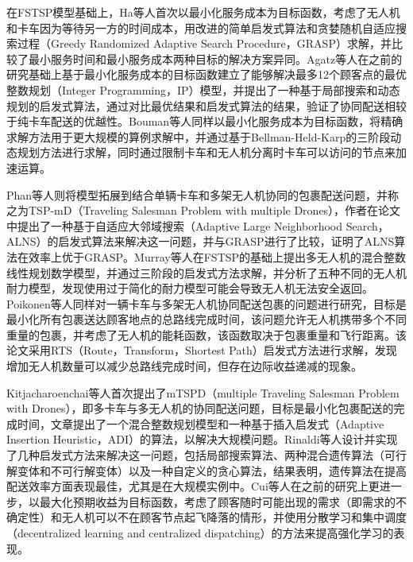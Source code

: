 \documentclass[fontset=none]{ctexart}
\begin{document}
在FSTSP模型基础上，Ha等人首次以最小化服务成本为目标函数\cite{haMincostTravelingSalesman2018}，考虑了无人机和卡车因为等待另一方的时间成本，用改进的简单启发式算法和贪婪随机自适应搜索过程（Greedy Randomized Adaptive Search Procedure，GRASP）求解，并比较了最小服务时间和最小服务成本两种目标的解决方案异同。Agatz等人在之前的研究基础上基于最小化服务成本的目标函数建立了能够解决最多12个顾客点的最优整数规划（Integer Programming，IP）模型\cite{agatzOptimizationApproachesTraveling2018}，并提出了一种基于局部搜索和动态规划的启发式算法，通过对比最优结果和启发式算法的结果，验证了协同配送相较于纯卡车配送的优越性。Bouman等人同样以最小化服务成本为目标函数\cite{boumanDynamicProgrammingApproaches2018}，将精确求解方法用于更大规模的算例求解中，并通过基于Bellman-Held-Karp的三阶段动态规划方法进行求解，同时通过限制卡车和无人机分离时卡车可以访问的节点来加速运算。

Phan等人则将模型拓展到结合单辆卡车和多架无人机协同的包裹配送问题\cite{tuTravelingSalesmanProblem2018}，并称之为TSP-mD（Traveling Salesman Problem with multiple Drones），作者在论文中提出了一种基于自适应大邻域搜索（Adaptive Large Neighborhood Search，ALNS）的启发式算法来解决这一问题，并与GRASP进行了比较，证明了ALNS算法在效率上优于GRASP。Murray等人在FSTSP的基础上提出多无人机的混合整数线性规划数学模型\cite{murrayMultipleFlyingSidekicks2020}，并通过三阶段的启发式方法求解，并分析了五种不同的无人机耐力模型，发现使用过于简化的耐力模型可能会导致无人机无法安全返回。Poikonen等人同样对一辆卡车与多架无人机协同配送包裹的问题进行研究\cite{poikonenMultivisitDroneRouting2020}，目标是最小化所有包裹送达顾客地点的总路线完成时间，该问题允许无人机携带多个不同重量的包裹，并考虑了无人机的能耗函数，该函数取决于包裹重量和飞行距离。该论文采用RTS（Route，Transform，Shortest Path）启发式方法进行求解，发现增加无人机数量可以减少总路线完成时间，但存在边际收益递减的现象。

Kitjacharoenchai等人首次提出了mTSPD（multiple Traveling Salesman Problem with Drones）\cite{kitjacharoenchaiMultipleTravelingSalesman2019}，即多卡车与多无人机的协同配送问题，目标是最小化包裹配送的完成时间，文章提出了一个混合整数规划模型和一种基于插入启发式（Adaptive Insertion Heuristic，ADI）的算法，以解决大规模问题。Rinaldi等人设计并实现了几种启发式方法来解决这一问题\cite{rinaldiDevelopmentHeuristicApproaches2023}，包括局部搜索算法、两种混合遗传算法（可行解变体和不可行解变体）以及一种自定义的贪心算法，结果表明，遗传算法在提高配送效率方面表现最佳，尤其是在大规模实例中。Cui等人在之前的研究上更进一步\cite{cuiDynamicCollaborativeTruckdrone2024}，以最大化预期收益为目标函数，考虑了顾客随时可能出现的需求（即需求的不确定性）和无人机可以不在顾客节点起飞降落的情形，并使用分散学习和集中调度（decentralized learning and centralized dispatching）的方法来提高强化学习的表现。
\end{document}
